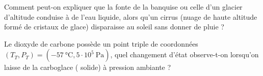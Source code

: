 
\begin{exercise}

    \begin{questions}
        \question Comment peut-on expliquer que la fonte de la banquise ou celle d'un glacier d'altitude conduise à de l'eau liquide, alors qu'un cirrus (nuage de haute altitude formé de cristaux de glace) disparaisse au soleil sans donner de pluie ?
            
        \question Le dioxyde de carbone possède un point triple de coordonnées $(T_T, P_T) = (-57~ \si{\celsius}, 5 \cdot 10^5 ~ \si{\pascal})$, quel changement d'état observe-t-on lorsqu'on laisse de la carboglace ( solide) à pression ambiante ?
            
    \end{questions}

\end{exercise}